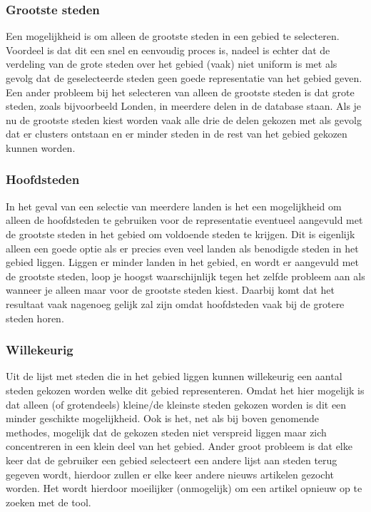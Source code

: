 \documentclass[twoside,openright]{uva-bachelor-thesis}
\begin{document}
			\subsubsection{Grootste steden}
				Een mogelijkheid is om alleen de grootste steden in een gebied te selecteren. Voordeel is dat dit een snel en eenvoudig proces is, nadeel is echter dat de verdeling van de grote steden over het gebied (vaak) niet uniform is met als gevolg dat de geselecteerde steden geen goede representatie van het gebied geven.
				Een ander probleem bij het selecteren van alleen de grootste steden is dat grote steden, zoals bijvoorbeeld Londen, in meerdere delen in de database staan. Als je nu de grootste steden kiest worden vaak alle drie de delen gekozen met als gevolg dat er clusters ontstaan en er minder steden in de rest van het gebied gekozen kunnen worden.
			\subsubsection{Hoofdsteden}
				In het geval van een selectie van meerdere landen is het een mogelijkheid om alleen de hoofdsteden te gebruiken voor de representatie eventueel aangevuld met de grootste steden in het gebied om voldoende steden te krijgen. Dit is eigenlijk alleen een goede optie als er precies even veel landen als benodigde steden in het gebied liggen. Liggen er minder landen in het gebied, en wordt er aangevuld met de grootste steden, loop je hoogst waarschijnlijk tegen het zelfde probleem aan als wanneer je alleen maar voor de grootste steden kiest. Daarbij komt dat het resultaat vaak nagenoeg gelijk zal zijn omdat hoofdsteden vaak bij de grotere steden horen. 
			\subsubsection{Willekeurig}
				Uit de lijst met steden die in het gebied liggen kunnen willekeurig een aantal steden gekozen worden welke dit gebied representeren. Omdat het hier mogelijk is dat alleen (of grotendeels) kleine/de kleinste steden gekozen worden is dit een minder geschikte mogelijkheid.  Ook is het, net als bij boven genomende methodes, mogelijk dat de gekozen steden niet verspreid liggen maar zich concentreren in een klein deel van het gebied. Ander groot probleem is dat elke keer dat de gebruiker een gebied selecteert een andere lijst aan steden terug gegeven wordt, hierdoor zullen er elke keer andere nieuws artikelen gezocht worden. Het wordt hierdoor moeilijker (onmogelijk) om een artikel opnieuw op te zoeken met de tool.
\end{document}
